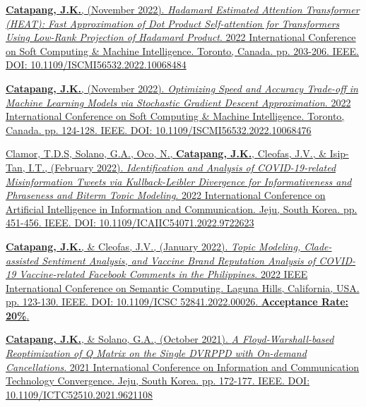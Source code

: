 \documentclass[margin]{res}
\begin{document}
\begin{resume}
\vspace{-12pt}

 \href{https://ieeexplore.ieee.org/document/10068484}{\textbf{Catapang, J.K.}, (November 2022). \textit{Hadamard Estimated Attention Transformer (HEAT): Fast Approximation of Dot Product Self-attention for Transformers Using Low-Rank Projection of Hadamard Product}. 2022 International Conference on Soft Computing \& Machine Intelligence. Toronto, Canada. pp. 203-206. IEEE. DOI: 10.1109/ISCMI56532.2022.10068484}

\vspace{-12pt}

 \href{https://ieeexplore.ieee.org/document/10068476}{\textbf{Catapang, J.K.}, (November 2022). \textit{Optimizing Speed and Accuracy Trade-off in Machine Learning Models via Stochastic Gradient Descent Approximation}. 2022 International Conference on Soft Computing \& Machine Intelligence. Toronto, Canada. pp. 124-128. IEEE. DOI: 10.1109/ISCMI56532.2022.10068476}

\vspace{-12pt}

 \href{https://ieeexplore.ieee.org/document/9722623}{Clamor, T.D.S, Solano, G.A., Oco, N., \textbf{Catapang, J.K.}, Cleofas, J.V., \& Isip-Tan, I.T., (February 2022). \textit{Identification and Analysis of COVID-19-related Misinformation Tweets via Kullback-Leibler Divergence for Informativeness and Phraseness and Biterm Topic Modeling}. 2022 International Conference on Artificial Intelligence in Information and Communication. Jeju, South Korea. pp. 451-456. IEEE. DOI: 10.1109/ICAIIC54071.2022.9722623}

\vspace{-12pt}

 \href{https://ieeexplore.ieee.org/document/9736280}{\textbf{Catapang, J.K.}, \& Cleofas, J.V., (January 2022). \textit{Topic Modeling, Clade-assisted Sentiment Analysis, and Vaccine Brand Reputation Analysis of COVID-19 Vaccine-related Facebook Comments in the Philippines}. 2022 IEEE International Conference on Semantic Computing. Laguna Hills, California, USA. pp. 123-130. IEEE. DOI: 10.1109/ICSC 52841.2022.00026. \textbf{Acceptance Rate: 20\%}.}

\newpage

 \href{https://ieeexplore.ieee.org/document/9621108}{\textbf{Catapang, J.K.}, \& Solano, G.A., (October 2021). \textit{A Floyd-Warshall-based Reoptimization of Q Matrix on the Single DVRPPD with On-demand Cancellations}. 2021 International Conference on Information and Communication Technology Convergence. Jeju, South Korea. pp. 172-177. IEEE. DOI: 10.1109/ICTC52510.2021.9621108}


\end{resume}
\end{document}

